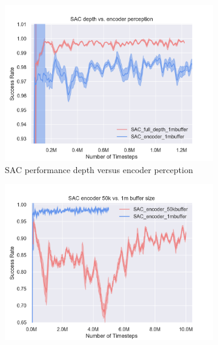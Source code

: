 
\begin{figure}[!htbp]
    \begin{subfigure}{0.49\textwidth}
        \includegraphics[width=\linewidth]{figures/SACfull/SAC_depth_vs_encoder_perception.png}
        \caption{SAC performance depth versus encoder perception} \label{fig:percep}
    \end{subfigure}%
    \hspace*{\fill}   %
    \begin{subfigure}{0.49\textwidth}
        \includegraphics[width=\linewidth]{figures/SACfull/SAC_encoder_50k_vs_1m_buffer_size}

\end{subfigure}
\end{figure}
